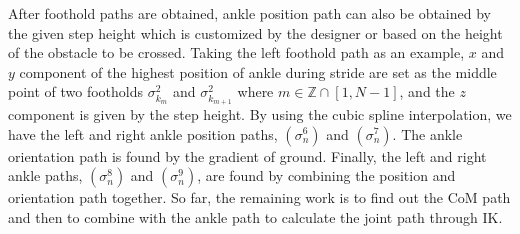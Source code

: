 \documentclass{ieeeaccess}
\begin{document}
After foothold paths are obtained, ankle position path can also be obtained by the given step height which is customized by the designer or based on the height of the obstacle to be crossed. Taking the left foothold path as an example, $x$ and $y$ component of the highest position of ankle during stride are set as the middle point of two footholds $\sigma^{2}_{k_m}$ and $\sigma^{2}_{k_{m+1}}$ where $m\in\mathbb{Z}\cap[1,N-1]$, and the $z$ component is given by the step height. By using the cubic spline interpolation, we have the left and right ankle position paths, $(\sigma^{6}_{n})$ and $(\sigma^{7}_{n})$. The ankle orientation path is found by the gradient of ground. Finally, the left and right ankle paths, $(\sigma^{8}_{n})$ and $(\sigma^{9}_{n})$, are found by combining the position and orientation path together. So far, the remaining work is to find out the CoM path and then to combine with the ankle path to calculate the joint path through IK.
\end{document}
